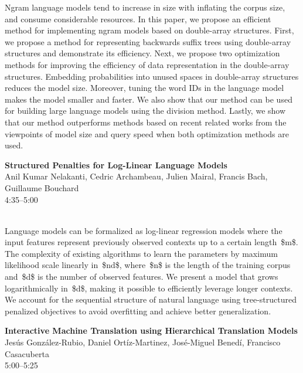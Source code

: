 \documentclass[twoside,makeidx]{book}
\begin{document}
\nopagebreak%
\noindent%
{\small Ngram language models tend to increase in size with inflating the corpus size, and consume considerable resources. In this paper, we propose an efficient method for implementing ngram models based on double-array structures. First, we propose a method for representing backwards suffix trees using double-array structures and demonstrate its efficiency. Next, we propose two optimization methods for improving the efficiency of data representation in the double-array structures. Embedding probabilities into unused spaces in double-array structures reduces the model size. Moreover, tuning the word IDs in the language model makes the model smaller and faster. We also show that our method can be used for building large language models using the division method. Lastly, we show that our method outperforms methods based on recent related works from the viewpoints of model size and query speed when both optimization methods are used.}
\par\vspace{2em}\noindent%
\begin{minipage}{\linewidth}%
\begin{center}
\textbf{\normalsize Structured Penalties for Log-Linear Language Models}\\
\normalsize  Anil Kumar Nelakanti,  Cedric Archambeau,  Julien Mairal,  Francis Bach,  Guillaume Bouchard\\
{\small 4:35--5:00}\\
\end{center}
\end{minipage}\\[0.5em]
\nopagebreak%
\noindent%
{\small Language models can be formalized as log-linear regression models where the input features represent previously observed contexts up to a certain length~\$m\$. The complexity of existing algorithms to learn the parameters by maximum likelihood scale linearly in~\$nd\$, where~\$n\$ is the length of the training corpus and~\$d\$ is the number of observed features. We present a model that grows logarithmically in~\$d\$, making it possible to efficiently leverage longer contexts. We account for the sequential structure of natural language using tree-structured penalized objectives to avoid overfitting and achieve better generalization.}
\par\vspace{2em}\noindent%
\begin{minipage}{\linewidth}%
\begin{center}
\textbf{\normalsize Interactive Machine Translation using Hierarchical Translation Models}\\
\normalsize  Jes\'{u}s Gonz\'{a}lez-Rubio,  Daniel Ort\'{i}z-Martinez,  Jos\'{e}-Miguel Bened\'{i},  Francisco Casacuberta\\
{\small 5:00--5:25}\\
\end{center}
\end{minipage}\\[0.5em]
\end{document}
